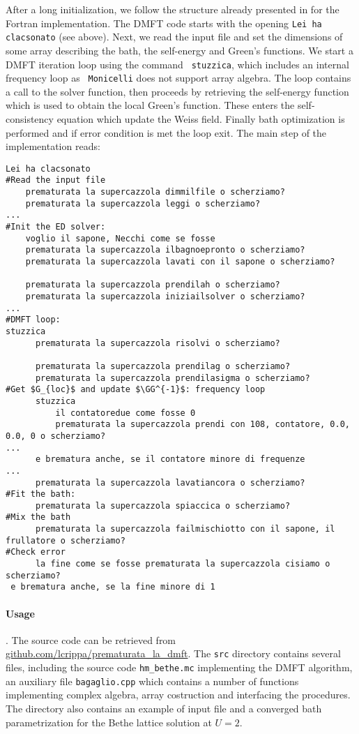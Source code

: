 \documentclass[edipack_sp.tex]{subfiles}
\begin{document}
After a long initialization, we follow the structure already presented
in  for the Fortran implementation.
The DMFT code starts with the opening {\tt Lei ha clacsonato} (see
above). Next, we read the input file and set the dimensions of some
array describing the bath, the self-energy and Green's
functions. We start a DMFT iteration loop using the command {\tt
  stuzzica}, which includes an internal frequency loop as {\tt
  Monicelli} does not support array algebra.
The loop contains a call to the \NAME solver function, then proceeds
by retrieving the self-energy function which is used to obtain the
local Green's function. These enters the self-consistency equation
which update the Weiss field. Finally bath optimization is performed
and if error condition is met the loop exit.
The main step of the implementation reads: 


\begin{lstlisting}[style=cstyle]
Lei ha clacsonato
#Read the input file
    prematurata la supercazzola dimmilfile o scherziamo?
    prematurata la supercazzola leggi o scherziamo? 
...                                                  
#Init the ED solver:
    voglio il sapone, Necchi come se fosse
    prematurata la supercazzola ilbagnoepronto o scherziamo?
    prematurata la supercazzola lavati con il sapone o scherziamo?
        
    prematurata la supercazzola prendilah o scherziamo?
    prematurata la supercazzola iniziailsolver o scherziamo?
...
#DMFT loop:
stuzzica    
      prematurata la supercazzola risolvi o scherziamo?
      
      prematurata la supercazzola prendilag o scherziamo?
      prematurata la supercazzola prendilasigma o scherziamo?
#Get $G_{loc}$ and update $\GG^{-1}$: frequency loop
      stuzzica                   
          il contatoredue come fosse 0
          prematurata la supercazzola prendi con 108, contatore, 0.0, 0.0, 0 o scherziamo?
...
      e brematura anche, se il contatore minore di frequenze
...      
      prematurata la supercazzola lavatiancora o scherziamo?
#Fit the bath:       
      prematurata la supercazzola spiaccica o scherziamo?
#Mix the bath           
      prematurata la supercazzola failmischiotto con il sapone, il frullatore o scherziamo?
#Check error      
      la fine come se fosse prematurata la supercazzola cisiamo o scherziamo?         
 e brematura anche, se la fine minore di 1
\end{lstlisting}

\paragraph{Usage}.
The source code can be retrieved from
\href{https://github.com/lcrippa/prematurata_la_dmft}{github.com/lcrippa/prematurata\_la\_dmft}. 
The {\tt src} directory contains several files, including the source
code {\tt hm\_bethe.mc} implementing the DMFT algorithm, an auxiliary file {\tt bagaglio.cpp} which
contains a number of functions implementing complex algebra, array
costruction and interfacing the \NAME procedures. The directory also
contains an example of input file and a converged bath parametrization
for the Bethe lattice solution at $U=2$.
\end{document}
